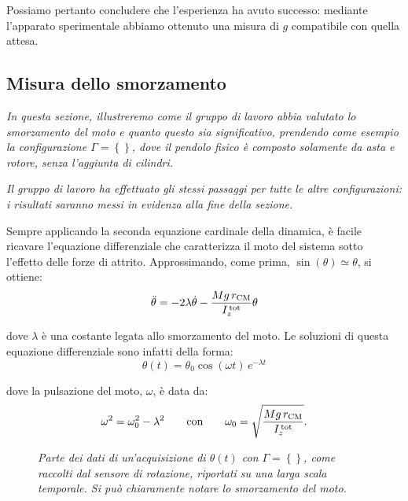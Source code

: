 \documentclass{article}
\begin{document}
Possiamo pertanto concludere che l'esperienza ha avuto successo:
mediante l'apparato sperimentale abbiamo ottenuto una misura di $g$
compatibile con quella attesa.

\pagebreak
\subsection{Misura dello smorzamento}

\emph{
  In questa sezione, illustreremo come il gruppo di lavoro abbia
  valutato lo smorzamento del moto e quanto questo sia significativo,
  prendendo come esempio la configurazione $\Gamma=\left\{\right\}$,
  dove il pendolo fisico è composto solamente da asta e rotore, senza
  l'aggiunta di cilindri.
}

\emph{
  Il gruppo di lavoro ha effettuato gli stessi passaggi per tutte le
  altre configurazioni: i risultati saranno messi in evidenza alla
  fine della sezione.
}
\vspace{2mm}

Sempre applicando la seconda equazione cardinale della dinamica,
è facile ricavare l'equazione differenziale che caratterizza il moto
del sistema sotto l'effetto delle forze di attrito.
Approssimando, come prima, $\sin(\theta)\simeq\theta$, si ottiene:
\[ \ddot{\theta} = -2\lambda\dot{\theta} -\frac{Mg\,r_\text{CM}}{I_z^\text{\,tot}} \theta \]

dove $\lambda$ è una costante legata allo smorzamento del moto.
Le soluzioni di questa equazione differenziale sono infatti della forma:
\[\theta(t) = \theta_0\cos(\omega t)\,e^{-\lambda t}\]

dove la pulsazione del moto, $\omega$, è data da:
\[
  \omega^2 = \omega_0^2 - \lambda^2
  \qquad\text{con}\qquad
  \omega_0 = \sqrt{\frac{Mg\,r_\text{CM}}{I_z^\text{\,tot}}}.
\]

\begin{center}
  \begin{figure}[H]
    \caption[]{\emph{
      Parte dei dati di un'acquisizione di $\theta(t)$
      con $\Gamma=\left\{\right\}$,
      come raccolti dal sensore di rotazione,
      riportati su una larga scala temporale.
      Si può chiaramente notare lo smorzamento
      del moto.
    }}
  \end{figure}
\end{center}
\end{document}
